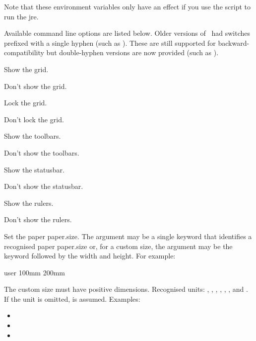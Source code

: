 \begin{important}
Note that these environment variables only have an effect if you
use the  script to run the \gls{jre}.
\end{important}

Available command line options are listed below.
Older versions of \FlowframTk\ had switches prefixed with a single
hyphen (such as ). These are still supported for
backward-compatibility but double-hyphen versions are now provided
(such as ).

Show the \gls{grid}.

Don't show the \gls{grid}.

Lock the \gls{grid}.

Don't lock the \gls{grid}.

Show the \glspl{toolbar}.

Don't show the \glspl{toolbar}.

Show the \gls{statusbar}.

Don't show the \gls{statusbar}.

Show the \glspl{ruler}.

Don't show the \glspl{ruler}.

Set the paper \gls{paper.size}. The argument may be a single keyword that
identifies a recognised paper \gls{paper.size} or, for a custom size, the
argument may be the keyword  followed by the width and
height. For example:
\begin{terminal}
  user 100mm 200mm
\end{terminal}

The custom size must have positive dimensions.
Recognised units: , ,
, , , ,
 and . If the unit is omitted,
 is assumed. Examples:
\begin{itemize}
\item {}
\item {}
\item {}
\end{itemize}

